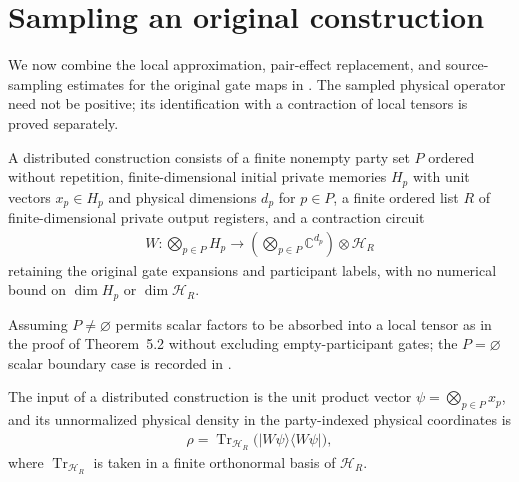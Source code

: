 \section{Sampling an original construction}
\label{sec:peps_original_compression_sampling}

We now combine the local approximation, pair-effect replacement, and source-sampling
estimates for the original gate maps in \cite[proof of Theorem~5.2]{OpenAI2026PolynomialPEPS}.
The sampled physical operator need not be positive; its identification with a
contraction of local tensors is proved separately.

\begin{definition}
    \label{def:peps_distributed_construction}
    \leanok
    A distributed construction consists of a finite nonempty party set $P$
    ordered without repetition, finite-dimensional initial private memories
    $H_p$ with unit vectors $x_p\in H_p$ and physical dimensions $d_p$ for
    $p\in P$, a finite ordered list $R$ of finite-dimensional private output
    registers, and a contraction circuit
    \begin{align}
        W:\bigotimes_{p\in P}H_p
        \longrightarrow
        \left(\bigotimes_{p\in P}\mathbb C^{d_p}\right)\otimes\mathcal H_R
        \label{eq:peps_distributed_construction_map}
    \end{align}
    retaining the original gate expansions and participant labels, with no
    numerical bound on $\dim H_p$ or $\dim\mathcal H_R$.

    Assuming $P\neq\varnothing$ permits scalar factors to be absorbed into a
    local tensor as in the proof of Theorem~5.2 without excluding empty-participant
    gates; the $P=\varnothing$ scalar boundary case is recorded in
    \cite{gap:polypeps_nonempty_parties}.
\end{definition}

\begin{definition}
    \label{def:peps_distributed_construction_density}
    \leanok
    The input of a distributed construction is the unit product vector
    $\psi=\bigotimes_{p\in P}x_p$, and its unnormalized physical density in the
    party-indexed physical coordinates is
    \begin{align}
        \rho=\operatorname{Tr}_{\mathcal H_R}
        \bigl(|W\psi\rangle\langle W\psi|\bigr),
        \label{eq:peps_distributed_construction_density}
    \end{align}
    where $\operatorname{Tr}_{\mathcal H_R}$ is taken in a finite orthonormal
    basis of $\mathcal H_R$.
\end{definition}

